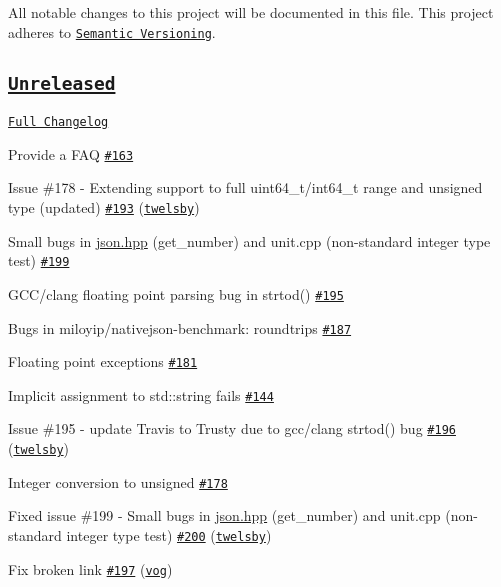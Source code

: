 All notable changes to this project will be documented in this file. This project adheres to \href{http://semver.org/}{\tt Semantic Versioning}.

\subsection*{\href{https://github.com/nlohmann/json/tree/HEAD}{\tt Unreleased}}

\href{https://github.com/nlohmann/json/compare/v1.1.0...HEAD}{\tt Full Changelog}


\begin{DoxyItemize}
\item Provide a F\+AQ \href{https://github.com/nlohmann/json/issues/163}{\tt \#163}
\item Issue \#178 -\/ Extending support to full uint64\+\_\+t/int64\+\_\+t range and unsigned type (updated) \href{https://github.com/nlohmann/json/pull/193}{\tt \#193} (\href{https://github.com/twelsby}{\tt twelsby})
\item Small bugs in \hyperlink{a00257_source}{json.\+hpp} (get\+\_\+number) and unit.\+cpp (non-\/standard integer type test) \href{https://github.com/nlohmann/json/issues/199}{\tt \#199}
\item G\+C\+C/clang floating point parsing bug in strtod() \href{https://github.com/nlohmann/json/issues/195}{\tt \#195}
\item Bugs in miloyip/nativejson-\/benchmark\+: roundtrips \href{https://github.com/nlohmann/json/issues/187}{\tt \#187}
\item Floating point exceptions \href{https://github.com/nlohmann/json/issues/181}{\tt \#181}
\item Implicit assignment to std\+::string fails \href{https://github.com/nlohmann/json/issues/144}{\tt \#144}
\item Issue \#195 -\/ update Travis to Trusty due to gcc/clang strtod() bug \href{https://github.com/nlohmann/json/pull/196}{\tt \#196} (\href{https://github.com/twelsby}{\tt twelsby})
\item Integer conversion to unsigned \href{https://github.com/nlohmann/json/issues/178}{\tt \#178}
\item Fixed issue \#199 -\/ Small bugs in \hyperlink{a00257_source}{json.\+hpp} (get\+\_\+number) and unit.\+cpp (non-\/standard integer type test) \href{https://github.com/nlohmann/json/pull/200}{\tt \#200} (\href{https://github.com/twelsby}{\tt twelsby})
\item Fix broken link \href{https://github.com/nlohmann/json/pull/197}{\tt \#197} (\href{https://github.com/vog}{\tt vog})
\end{DoxyItemize}

